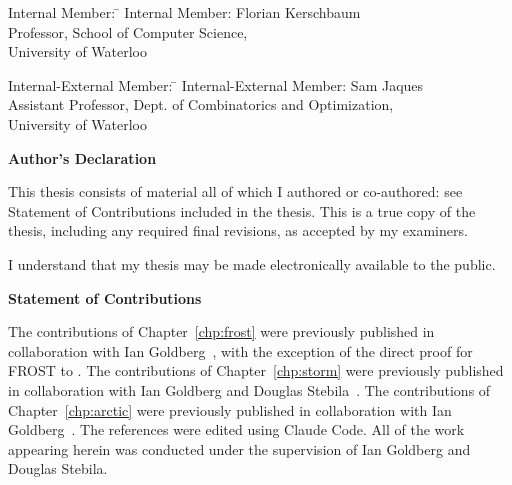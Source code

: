   \noindent
\begin{tabbing}
Internal Member: \=  \kill %
Internal Member: \> Florian Kerschbaum \\
\> Professor, School of Computer Science, \\
\> University of Waterloo \\
\end{tabbing}

  \noindent
\begin{tabbing}
Internal-External Member: \=  \kill %
Internal-External Member: \> Sam Jaques \\
\> Assistant Professor, Dept. of Combinatorics and Optimization, \\
\> University of Waterloo \\
\end{tabbing}
  \bigskip


\cleardoublepage
{}    %

 \begin{center}\textbf{Author's Declaration}\end{center}

This thesis consists of material all of which I authored or co-authored: see Statement of Contributions included in the thesis. This is a true copy of the thesis, including any required final revisions, as accepted by my examiners.

  \bigskip

  \noindent
I understand that my thesis may be made electronically available to the public.

\newpage

 \begin{center}\textbf{Statement of Contributions}\end{center}

 \noindent
The contributions of Chapter~\ref{chp:frost} were previously published in collaboration with Ian Goldberg~\cite{KomloG20},
with the exception of the direct proof for FROST to \AOMDL.
The contributions of Chapter~\ref{chp:storm} were previously published in collaboration with Ian Goldberg and Douglas Stebila~\cite{KomloGS23}.
The contributions of Chapter~\ref{chp:arctic} were previously published in collaboration with Ian Goldberg~\cite{KomloG24}.
The references were edited using Claude Code.
All of the work appearing herein was conducted under the supervision of Ian Goldberg and Douglas Stebila.


